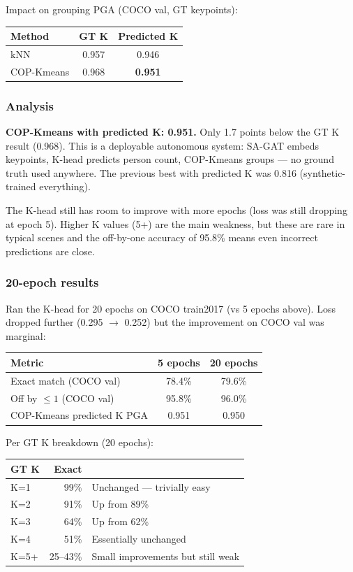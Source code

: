 Impact on grouping PGA (COCO val, GT keypoints):

\begin{tabular}{lcc}
\hline
\textbf{Method} & \textbf{GT K} & \textbf{Predicted K} \\
\hline
kNN & 0.957 & 0.946 \\
COP-Kmeans & 0.968 & \textbf{0.951} \\
\hline
\end{tabular}

\subsubsection{Analysis}

\textbf{COP-Kmeans with predicted K: 0.951.} Only 1.7 points below the GT K result (0.968). This is a deployable autonomous system: SA-GAT embeds keypoints, K-head predicts person count, COP-Kmeans groups --- no ground truth used anywhere. The previous best with predicted K was 0.816 (synthetic-trained everything).

The K-head still has room to improve with more epochs (loss was still dropping at epoch 5). Higher K values (5+) are the main weakness, but these are rare in typical scenes and the off-by-one accuracy of 95.8\% means even incorrect predictions are close.

\subsubsection{20-epoch results}

Ran the K-head for 20 epochs on COCO train2017 (vs 5 epochs above). Loss dropped further (0.295 $\to$ 0.252) but the improvement on COCO val was marginal:

\begin{tabular}{lcc}
\hline
\textbf{Metric} & \textbf{5 epochs} & \textbf{20 epochs} \\
\hline
Exact match (COCO val) & 78.4\% & 79.6\% \\
Off by $\leq 1$ (COCO val) & 95.8\% & 96.0\% \\
COP-Kmeans predicted K PGA & 0.951 & 0.950 \\
\hline
\end{tabular}

\vspace{0.5em}

Per GT K breakdown (20 epochs):

\begin{tabular}{lrl}
\hline
\textbf{GT K} & \textbf{Exact} & \\
\hline
K=1 & 99\% & Unchanged --- trivially easy \\
K=2 & 91\% & Up from 89\% \\
K=3 & 64\% & Up from 62\% \\
K=4 & 51\% & Essentially unchanged \\
K=5+ & 25--43\% & Small improvements but still weak \\
\hline
\end{tabular}

